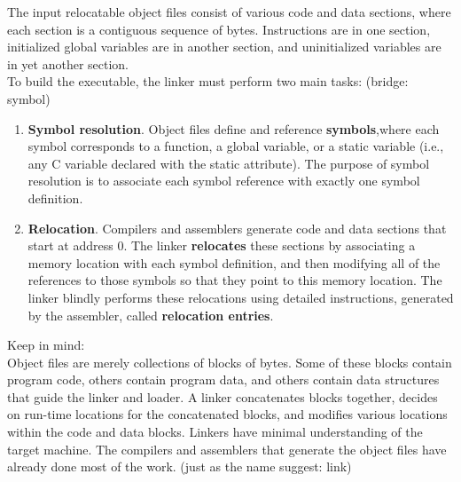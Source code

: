 \documentclass[11pt]{article}
\begin{document}
The input relocatable object files consist of various code and data sections, where each section is a contiguous sequence of bytes. Instructions are in one section, initialized global variables are in another section, and uninitialized variables are in yet another section.\\



To build the executable, the linker must perform two main tasks: (bridge: symbol)\\
\begin{enumerate}
\item \textbf{Symbol resolution}. Object files define and reference \textbf{symbols},where each symbol corresponds to a function, a global variable, or a static variable (i.e., any C variable declared with the static attribute). The purpose of symbol resolution is to associate each symbol reference with exactly one symbol definition.\\
\item \textbf{Relocation}. Compilers and assemblers generate code and data sections that start at address 0. The linker \textbf{relocates} these sections by associating a memory location with each symbol definition, and then modifying all of the references to those symbols so that they point to this memory location. The linker blindly performs these relocations using detailed instructions, generated by the assembler, called \textbf{relocation entries}.\\
\end{enumerate}

Keep in mind:\\
Object files are merely collections of blocks of bytes. Some of these blocks contain program code, others contain program data, and others contain data structures that guide the linker and loader. A linker concatenates blocks together, decides on run-time locations for the concatenated blocks, and modifies various locations within the code and data blocks. Linkers have minimal understanding of the target machine. The compilers and assemblers that generate the object files have already done most of the work. (just as the name suggest: link)\\
\end{document}
